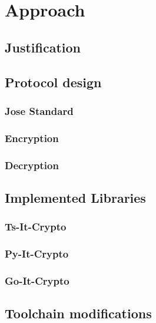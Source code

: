 \documentclass[../main.tex]{subfiles}
\newcommand{\mycomment}[1]{}
\begin{document}
\chapter{Approach}

\mycomment{
    - chapter before: solution space
    - this chapter: what approach was chosen and what consequences did the approach have for the implementation
    - Justification: Why? Differences to other/similiar protocols
    - Implemented Libraries: requriement to implement crypto libs in three languages
    - Toolchain modification: E2EE implies changes in the existent toolchain
}

\section{Justification}

\section{Protocol design}

\subsection{Jose Standard}

\subsection{Encryption}

\subsection{Decryption}

\section{Implemented Libraries}

\subsection{Ts-It-Crypto}

\subsection{Py-It-Crypto}

\subsection{Go-It-Crypto}

\section{Toolchain modifications}
\end{document}

